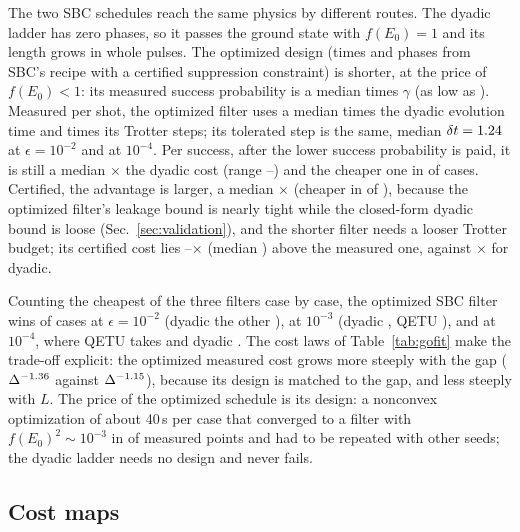 \documentclass[aps,pra,twocolumn,superscriptaddress,nofootinbib]{revtex4-2}
\begin{document}
The two SBC schedules reach the same physics by different routes. The dyadic ladder has zero phases, so it
passes the ground state with $f(E_0)=1$ and its length grows in whole pulses. The optimized design
(times and phases from SBC's recipe with a certified suppression constraint) is shorter, at the price of
$f(E_0)<1$: its measured success probability is a median \optPgMed{} times $\gamma$ (as low as
\optPgLo). Measured per shot, the optimized filter uses a median \odShotTime{} times the dyadic evolution
time and \odShotSteps{} times its Trotter steps; its tolerated step is the same, median $\delta
t=1.24$ at $\epsilon=10^{-2}$ and \fDtOFour{} at $10^{-4}$. Per success, after the lower success
probability is paid, it is still a median \odMMed$\times$ the dyadic cost (range \odMLo--\odMHi) and the
cheaper one in \odMWins{} of \goNcases{} cases. Certified, the advantage is larger, a median \odCMed$\times$
(cheaper in \odCWins{} of \goNcases), because the optimized filter's leakage bound is nearly tight while the
closed-form dyadic bound is loose (Sec.~\ref{sec:validation}), and the shorter filter needs a looser Trotter
budget; its certified cost lies \goCertRatioOptMin--\goCertRatioOptMax$\times$ (median
\goCertRatioOptMed) above the measured one, against \goCertRatioMed$\times$ for dyadic.

Counting the cheapest of the three filters case by case, the optimized SBC filter wins \bestOpTwo{} of
\goCasesTwo{} cases at $\epsilon=10^{-2}$ (dyadic the other \bestDyTwo), \bestOpThree{} at $10^{-3}$
(dyadic \bestDyThree, QETU \bestQeThree), and \bestOpFour{} at $10^{-4}$, where QETU takes \bestQeFour{} and
dyadic \bestDyFour. The cost laws of Table~\ref{tab:gofit} make the trade-off explicit: the optimized
measured cost grows more steeply with the gap ($\Delta^{-1.36}$ against $\Delta^{-1.15}$), because its
design is matched to the gap, and less steeply with $L$. The price of the optimized schedule is its
design: a nonconvex optimization of about 40\,s per case that converged to a filter with $f(E_0)^2\sim10^{-3}$
in \optRetried{} of \optPoints{} measured points and had to be repeated with other seeds; the dyadic ladder
needs no design and never fails.

\subsection{Cost maps}
\end{document}
